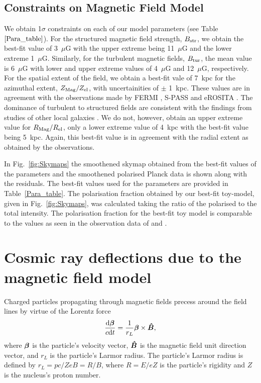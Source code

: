 \documentclass[usenatbib]{mnras}
\newcommand{\bfm}[1]{\mbox{\boldmath$ #1 $}}
\begin{document}
\subsection{Constraints on Magnetic Field Model}
\label{Results}
We obtain 1$\sigma$ constraints on each of our model parameters (see Table~$\ref{Para_table}$). For the structured magnetic field strength, $B_{\rm str}$, we obtain the best-fit value of 3~$\mu$G with the upper extreme being 11~$\mu$G and the lower extreme 1~$\mu$G. Similarly, for the turbulent magnetic fields, $B_{\rm tur}$, the mean value is 6~$\mu$G with lower and upper extreme values of 4~$\mu$G and 12~$\mu$G, respectively. For the spatial extent of the field, we obtain a best-fit vale of 7~kpc for the azimuthal extent, $Z_{\rm Mag}/Z_{\rm el}$, with uncertainities of $\pm$ 1~kpc. These values are in agreement with the observations made by FERMI \citep{Su_2010}, S-PASS \citep{Carretti_2013} and eROSITA \citep{eROSITA}. The dominance of turbulent to structured fields are consistent with the findings from studies of other local galaxies \citep{Beck_NGC_6946,Tabatabaei_2008}. We do not, however, obtain an upper extreme value for $R_{\rm Mag}/R_{\rm el}$, only a lower extreme value of 4~kpc with the best-fit value being 5~kpc. Again, this best-fit value is in agreement with the radial extent as obtained by the observations.

In Fig.~\ref{fig:Skymaps} the smoothened skymap obtained from the best-fit values of the parameters and the smoothened polarised Planck data is shown along with the residuals. The best-fit values used for the parameters are provided in Table~\ref{Para_table}. 
The polarisation fraction obtained by our best-fit toy-model, given in Fig.~\ref{fig:Skymaps}, was calculated taking the ratio of the polarised to the total intensity. The polarisation fraction for the best-fit toy model is comparable to the values as seen in the observation data of \citet{WMAP_Page} and \citet{Carretti_2013}.





\section{Cosmic ray deflections due to the magnetic field model}
\label{Deflections}

Charged particles propagating through magnetic fields precess around the field lines by virtue of the Lorentz force 
\begin{eqnarray}
\frac{{\rm d}\bfm{\beta}}{c{\rm d}t} = \frac{1}{r_{L}}\bfm{\beta}\times \bfm{\hat{B}}, 
\end{eqnarray}
where $\bfm{\beta}$ is the particle's velocity vector, $\bfm{\hat{B}}$ is the magnetic field unit direction vector, and $r_{L}$ is the particle's Larmor radius. The particle's Larmor radius is defined by $r_{L}=pc/ZeB=R/B$, where $R=E/eZ $ is the particle's rigidity and $Z$ is the nucleus's proton number. 
\end{document}
